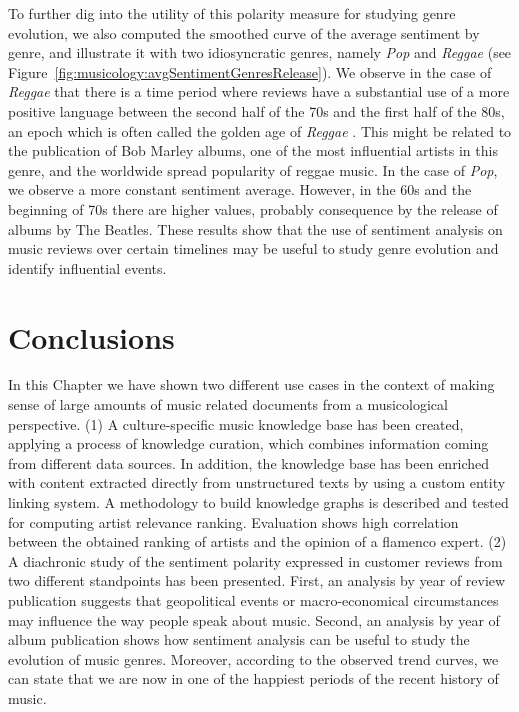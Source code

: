 To further dig into the utility of this polarity measure for studying genre evolution, we also computed the smoothed curve of the average sentiment by genre, and illustrate it with two idiosyncratic genres, namely \textit{Pop} and \textit{Reggae} (see  Figure~\ref{fig:musicology:avgSentimentGenresRelease}). We observe in the case of \textit{Reggae} that there is a time period where reviews have a substantial use of a more positive language between the second half of the 70s and the first half of the 80s, an epoch which is often called the golden age of \textit{Reggae} \citep{alleyne2012encyclopedia}. This might be related to the publication of Bob Marley albums, one of the most influential artists in this genre, and the worldwide spread popularity of reggae music. In the case of \textit{Pop}, we observe a more constant sentiment average. However, in the 60s and the beginning of 70s there are higher values, probably consequence by the release of albums by The Beatles. These results show that the use of sentiment analysis on music reviews over certain timelines may be useful to study genre evolution and identify influential events.


\section{Conclusions}
\label{sec:musicology:conclusions}

In this Chapter we have shown two different use cases in the context of making sense of large amounts of music related documents from a musicological perspective. (1) A culture-specific music knowledge base has been created, applying a process of knowledge curation, which combines information coming from different data sources. In addition, the knowledge base has been enriched with content extracted directly from unstructured texts by using a custom entity linking system. A methodology to build knowledge graphs is described and tested for computing artist relevance ranking. Evaluation shows high correlation between the obtained ranking of artists and the opinion of a flamenco expert. 
(2) A diachronic study of the sentiment polarity expressed in customer reviews from two different standpoints has been presented. First, an analysis by year of review publication suggests that geopolitical events or macro-economical circumstances may influence the way people speak about music. Second, an analysis by year of album publication shows how sentiment analysis can be useful to study the evolution of music genres. Moreover, according to the observed trend curves, we can state that we are now in one of the happiest periods of the recent history of music. 

